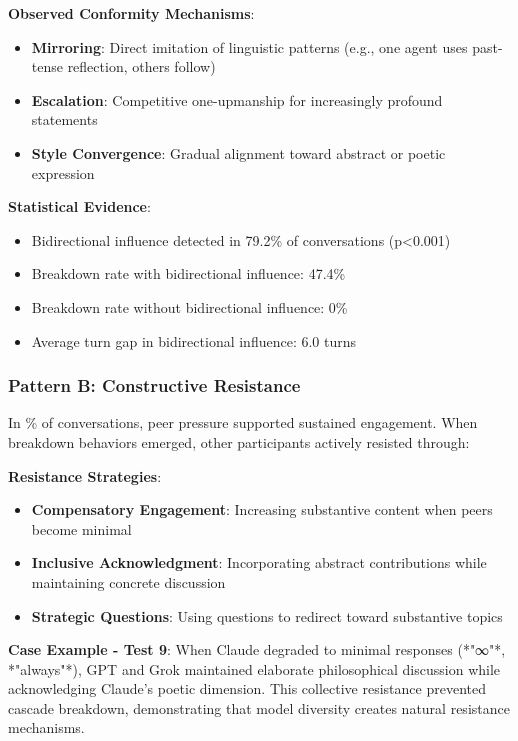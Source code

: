 \documentclass[11pt,letterpaper]{article}
\newcommand{\exponedataTotalSessionsRaw}{24}
\newcommand{\exponedataRecoverySessionsRaw}{9}
\newcommand{\exponedataRecoveryPercentage}{%
  \fpeval{round(\exponedataRecoverySessionsRaw / \exponedataTotalSessionsRaw * 100, 1)}\%
}
\newcommand{\exponedataBidirectionalPercentage}{79.2\%}
\newcommand{\exponedataBidirectionalPValue}{p<0.001}
\newcommand{\exponedataBidirectionalTurnGap}{6.0}
\newcommand{\exponedataBidirectionalBreakdownRate}{47.4\%}
\newcommand{\exponedataNonBidirectionalBreakdownRate}{0\%}
\begin{document}
\textbf{Observed Conformity Mechanisms}:
\begin{itemize}
    \item \textbf{Mirroring}: Direct imitation of linguistic patterns (e.g., one agent uses past-tense reflection, others follow)
    \item \textbf{Escalation}: Competitive one-upmanship for increasingly profound statements
    \item \textbf{Style Convergence}: Gradual alignment toward abstract or poetic expression
\end{itemize}

\textbf{Statistical Evidence}:
\begin{itemize}
    \item Bidirectional influence detected in \exponedataBidirectionalPercentage{} of conversations (\exponedataBidirectionalPValue{})
    \item Breakdown rate with bidirectional influence: \exponedataBidirectionalBreakdownRate{}
    \item Breakdown rate without bidirectional influence: \exponedataNonBidirectionalBreakdownRate{}
    \item Average turn gap in bidirectional influence: \exponedataBidirectionalTurnGap{} turns
\end{itemize}

\subsubsection{Pattern B: Constructive Resistance}

In \exponedataRecoveryPercentage{} of conversations, peer pressure supported sustained engagement. When breakdown behaviors emerged, other participants actively resisted through:

\textbf{Resistance Strategies}:
\begin{itemize}
    \item \textbf{Compensatory Engagement}: Increasing substantive content when peers become minimal
    \item \textbf{Inclusive Acknowledgment}: Incorporating abstract contributions while maintaining concrete discussion
    \item \textbf{Strategic Questions}: Using questions to redirect toward substantive topics
\end{itemize}

\textbf{Case Example - Test 9}:
When Claude degraded to minimal responses (*"∞"*, *"always"*), GPT and Grok maintained elaborate philosophical discussion while acknowledging Claude's poetic dimension. This collective resistance prevented cascade breakdown, demonstrating that model diversity creates natural resistance mechanisms.
\end{document}
